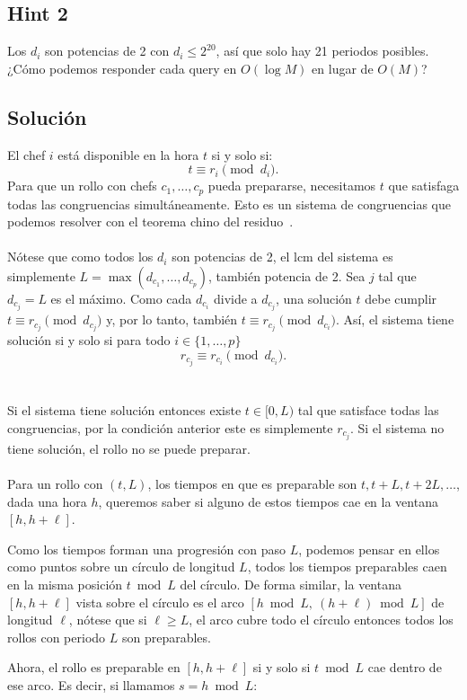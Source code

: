 \subsection*{Hint 2}
Los $d_i$ son potencias de 2 con $d_i \leq 2^{20}$, así que
solo hay 21 periodos posibles. ¿Cómo podemos responder
cada query en $O(\log M)$ en lugar de $O(M)$?
\subsection*{Solución}
El chef $i$ está disponible en la hora $t$ si y solo si:
\[
t \equiv r_i \pmod{d_i}.
\]
Para que un rollo con chefs $c_1, \ldots, c_p$ pueda prepararse,
necesitamos $t$ que satisfaga todas las congruencias simultáneamente.
Esto es un sistema de congruencias que podemos resolver con el teorema chino del residuo~\cite{cf_crt}.
 \\\\
Nótese que como todos los $d_i$ son potencias de 2, el $\text{lcm}$ del sistema es simplemente $L = \max(d_{c_1}, \ldots, d_{c_p})$, también potencia de 2. Sea $j$ tal que $d_{c_j} = L$ es el máximo. Como cada $d_{c_i}$ divide a $d_{c_j}$, una solución $t$ debe cumplir $t \equiv r_{c_j} \pmod{d_{c_j}}$ y, por lo tanto, también $t \equiv r_{c_j} \pmod{d_{c_i}}$. Así, el sistema tiene solución si y solo si para todo $i \in \{1,\dots, p\}$
\[r_{c_j} \equiv r_{c_i} \pmod{d_{c_i}}.\]
\\\\
Si el sistema tiene solución entonces existe $t \in [0, L)$ tal que
satisface todas las congruencias, por la condición anterior este es simplemente $r_{c_j}$. Si el sistema no tiene solución, el rollo no se puede preparar.
\\\\
Para un rollo con $(t, L)$, los tiempos en que es preparable
son $t, t+L, t+2L, \ldots$, dada una hora $h$, queremos saber si alguno
de estos tiempos cae en la ventana $[h, h+\ell]$.

Como los tiempos forman una progresión con paso $L$, podemos pensar
en ellos como puntos sobre un círculo de longitud $L$, todos los
tiempos preparables caen en la misma posición $t \bmod L$ del círculo.
De forma similar, la ventana $[h, h+\ell]$ vista sobre el círculo es
el arco $[h \bmod L,\ (h+\ell) \bmod L]$ de longitud $\ell$, nótese que si $\ell \geq L$, el arco cubre todo el círculo entonces todos los rollos con periodo $L$ son preparables.
 
Ahora, el rollo es preparable en $[h, h+\ell]$ si y solo si
$t \bmod L$ cae dentro de ese arco. Es decir, si llamamos
$s = h \bmod L$:
 
